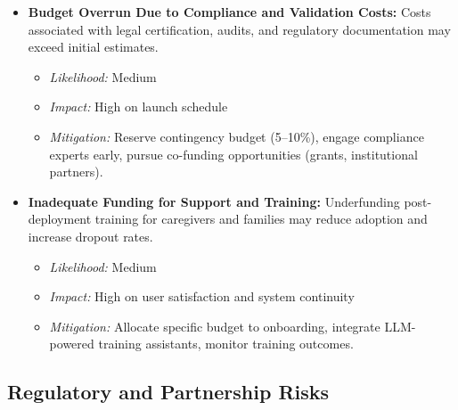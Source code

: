 \documentclass[
  letterpaper,
  DIV=11,
  numbers=noendperiod]{scrartcl}
\providecommand{\tightlist}{%
  \setlength{\itemsep}{0pt}\setlength{\parskip}{0pt}}\usepackage{longtable,booktabs,array}
\begin{document}
\begin{itemize}
\tightlist
\item
  \textbf{Budget Overrun Due to Compliance and Validation Costs:} Costs
  associated with legal certification, audits, and regulatory
  documentation may exceed initial estimates.

  \begin{itemize}
  \tightlist
  \item
    \emph{Likelihood:} Medium
  \item
    \emph{Impact:} High on launch schedule
  \item
    \emph{Mitigation:} Reserve contingency budget (5--10\%), engage
    compliance experts early, pursue co-funding opportunities (grants,
    institutional partners).
  \end{itemize}
\item
  \textbf{Inadequate Funding for Support and Training:} Underfunding
  post-deployment training for caregivers and families may reduce
  adoption and increase dropout rates.

  \begin{itemize}
  \tightlist
  \item
    \emph{Likelihood:} Medium
  \item
    \emph{Impact:} High on user satisfaction and system continuity
  \item
    \emph{Mitigation:} Allocate specific budget to onboarding, integrate
    LLM-powered training assistants, monitor training outcomes.
  \end{itemize}
\end{itemize}

\subsection{Regulatory and Partnership
Risks}\label{regulatory-and-partnership-risks}
\end{document}
